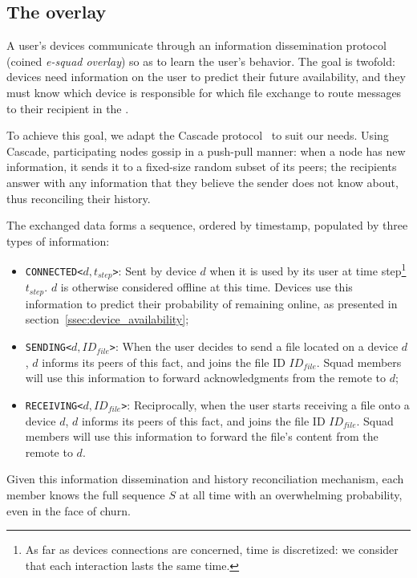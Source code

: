 
\subsection{The \squad overlay}
\label{sec:squad_overlay}

A user's devices communicate through an information dissemination protocol (coined \emph{e-squad overlay}) so as to learn the user's behavior.
The goal is twofold: 
devices need information on the user to predict their future availability, 
and they must know which device is responsible for which file exchange to route messages to their recipient in the \squad.

To achieve this goal, we adapt the Cascade protocol~\cite{luxey:cascade} to suit our needs. 
Using Cascade, participating nodes gossip in a push-pull manner: 
when a node has new information, it sends it to a fixed-size random subset of its peers; 
the recipients answer with any information that they believe the sender does not know about, thus reconciling their history.

The exchanged data forms a sequence, ordered by timestamp, populated by three types of information:
\begin{itemize}
	\item \texttt{CONNECTED<$d, t_{step}$>}: Sent by device $d$ when it is used by its user at time step\footnote{As far as devices connections are concerned, time is discretized: we consider that each interaction lasts the same time.} $t_{step}$. $d$ is otherwise considered offline at this time. Devices use this information to predict their probability of remaining online, as presented in section~\ref{ssec:device_availability};
	\item \texttt{SENDING<$d, ID_{file}$>}: When the user decides to send a file located on a device $d$, $d$ informs its peers of this fact, and joins the file ID $ID_{file}$. Squad members will use this information to forward acknowledgments from the remote to $d$;
	\item \texttt{RECEIVING<$d, ID_{file}$>}: Reciprocally, when the user starts receiving a file onto a device $d$, $d$ informs its peers of this fact, and joins the file ID $ID_{file}$. Squad members will use this information to forward the file's content from the remote to $d$.
\end{itemize}

Given this information dissemination and history reconciliation mechanism, each \squad member knows the full sequence $S$ at all time with an overwhelming probability, even in the face of churn.

